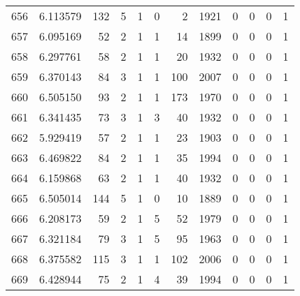 \begin{tabular}{lrrrrrrrrrrr}
656 &  6.113579 &  132 &      5 &        1 &      0 &               2 &  1921 &               0 &               0 &               0 &               1 \\
657 &  6.095169 &   52 &      2 &        1 &      1 &              14 &  1899 &               0 &               0 &               0 &               1 \\
658 &  6.297761 &   58 &      2 &        1 &      1 &              20 &  1932 &               0 &               0 &               0 &               1 \\
659 &  6.370143 &   84 &      3 &        1 &      1 &             100 &  2007 &               0 &               0 &               0 &               1 \\
660 &  6.505150 &   93 &      2 &        1 &      1 &             173 &  1970 &               0 &               0 &               0 &               1 \\
661 &  6.341435 &   73 &      3 &        1 &      3 &              40 &  1932 &               0 &               0 &               0 &               1 \\
662 &  5.929419 &   57 &      2 &        1 &      1 &              23 &  1903 &               0 &               0 &               0 &               1 \\
663 &  6.469822 &   84 &      2 &        1 &      1 &              35 &  1994 &               0 &               0 &               0 &               1 \\
664 &  6.159868 &   63 &      2 &        1 &      1 &              40 &  1932 &               0 &               0 &               0 &               1 \\
665 &  6.505014 &  144 &      5 &        1 &      0 &              10 &  1889 &               0 &               0 &               0 &               1 \\
666 &  6.208173 &   59 &      2 &        1 &      5 &              52 &  1979 &               0 &               0 &               0 &               1 \\
667 &  6.321184 &   79 &      3 &        1 &      5 &              95 &  1963 &               0 &               0 &               0 &               1 \\
668 &  6.375582 &  115 &      3 &        1 &      1 &             102 &  2006 &               0 &               0 &               0 &               1 \\
669 &  6.428944 &   75 &      2 &        1 &      4 &              39 &  1994 &               0 &               0 &               0 &               1 \\

\end{tabular}

